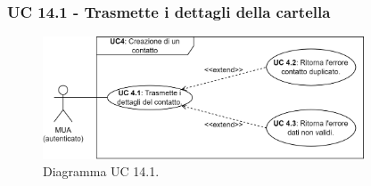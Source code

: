 \subsubsection{UC 14.1 - Trasmette i dettagli della cartella} \label{sec:UC14.1}
    \begin{figure}[h]
        \includegraphics[width=0.85\textwidth]{sections/uc_imgs/UC04.X.png}
        \centering
        \caption{Diagramma UC 14.1.}
    \end{figure}

